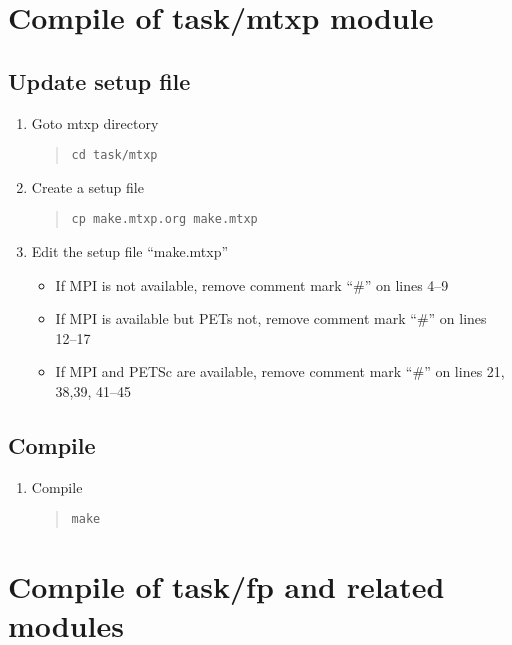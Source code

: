 \documentclass[11pt]{article}
\begin{document}
\section{Compile of task/mtxp module}

\subsection{Update setup file}
\begin{enumerate}
\item
Goto mtxp directory
\begin{quote}
\begin{verbatim}
cd task/mtxp
\end{verbatim}
\end{quote}
\item
Create a setup file 
\begin{quote}
\begin{verbatim}
cp make.mtxp.org make.mtxp
\end{verbatim}
\end{quote}
\item
Edit the setup file ``make.mtxp''
\begin{itemize}
\item
If MPI is not available, 
remove comment mark ``\#'' on lines 4--9
\item
If MPI is available but PETs not, 
remove comment mark ``\#'' on lines 12--17
\item
If MPI and PETSc are available, 
remove comment mark ``\#'' on lines 21, 38,39, 41--45
\end{itemize}
\end{enumerate}
\subsection{Compile}
\begin{enumerate}
\item
Compile
\begin{quote}
\begin{verbatim}
make
\end{verbatim}
\end{quote}
\end{enumerate}

\section{Compile of task/fp and related modules}
\end{document}
